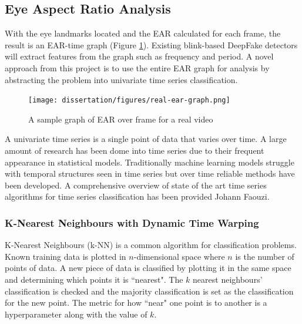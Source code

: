 \subsection{Eye Aspect Ratio Analysis}


With the eye landmarks located and the EAR calculated for each frame, the result is an EAR-time graph (Figure \ref{fig:real-ear-graph}). Existing blink-based DeepFake detectors will extract features from the graph such as frequency and period. A novel approach from this project is to use the entire EAR graph for analysis by abstracting the problem into univariate time series classification.

\begin{figure}[h]
    \centering
    \texttt{[image: dissertation/figures/real-ear-graph.png]}
    \caption{A sample graph of EAR over frame for a real video}
    \label{fig:real-ear-graph}
\end{figure}

A univariate time series is a single point of data that varies over time. A large amount of research has been dome into time series due to their frequent appearance in statistical models. Traditionally machine learning models struggle with temporal structures seen in time series but over time reliable methods have been developed. A comprehensive overview of state of the art time series algorithms for time series classification has been provided Johann Faouzi\cite{faouzi2024time}.

\subsubsection{K-Nearest Neighbours with Dynamic Time Warping}

K-Nearest Neighbours (k-NN) is a common algorithm for classification problems. Known training data is plotted in $n$-dimensional space where $n$ is the number of points of data. A new piece of data is classified by plotting it in the same space and determining which points it is ``nearest". The $k$ nearest neighbours' classification is checked and the majority classification is set as the classification for the new point. The metric for how ``near" one point is to another is a hyperparameter along with the value of $k$.

